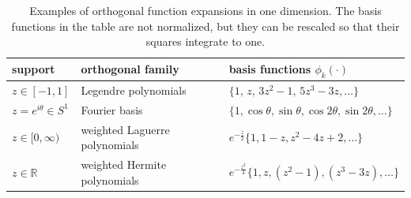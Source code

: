 
\begin{table}[t]
\small
    \centering
    \caption{Examples of orthogonal function expansions in one dimension. The basis functions in the
        table are not normalized, but they can be rescaled so that their squares integrate to one.
    \vspace{5pt}
    }

    \label{tab:onedim}
    \begin{tabular}{lll}
    \toprule
    \textbf{support} & \textbf{orthogonal family} & \textbf{basis functions} $\phi_k(\cdot)$  \\ [0.3ex]
    \midrule
    $z\in[-1,1]$ & Legendre polynomials & $\{1,\, z,\, 3z^2\!-\!1,\, 5z^3\!-\!3z, \ldots\}$ \\ [0.3ex]
    $z=e^{i\theta}\!\in S^1$\hspace{2ex} & Fourier basis & $\{1,\cos\theta,\sin\theta,\cos 2\theta,\sin 2\theta,\ldots\}$ \\[0.3ex]
    $z\in[0,\infty)$ & weighted Laguerre polynomials &    $e^{-\frac{z}{2}}\{1,1\!-\!z,z^2\!-\!4z\!+\!2,\ldots\}$\\ [-0.3ex]
    $z\in\mathbb{R}$ & weighted Hermite polynomials & $e^{-\frac{z^2}{4}}\{1,z,(z^2\!-\!1),(z^3\!-\!3z),\ldots\}$\\ [0.5ex]
    \bottomrule
    \end{tabular}
    \vspace{-10pt}
\end{table}

